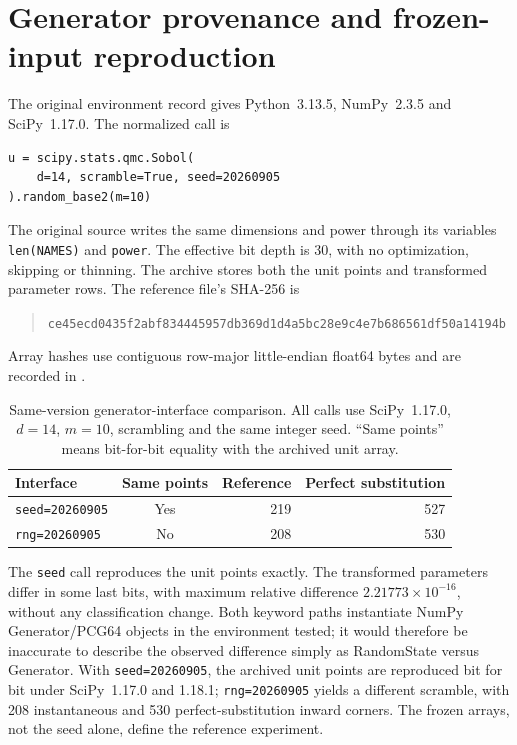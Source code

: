 \documentclass[11pt,a4paper]{article}
\begin{document}
\section{Generator provenance and frozen-input reproduction}
The original environment record gives Python~3.13.5, NumPy~2.3.5 and
SciPy~1.17.0. The normalized call is
\begin{verbatim}
u = scipy.stats.qmc.Sobol(
    d=14, scramble=True, seed=20260905
).random_base2(m=10)
\end{verbatim}
The original source writes the same dimensions and power through its
variables \texttt{len(NAMES)} and \texttt{power}. The effective bit depth
is 30, with no optimization, skipping or thinning. The archive stores
both the unit points and transformed parameter rows. The reference
file's SHA-256 is
\begin{quote}\small\ttfamily
\nolinkurl{ce45ecd0435f2abf834445957db369d1d4a5bc28e9c4e7b686561df50a14194b}
\end{quote}
Array hashes use contiguous row-major little-endian float64 bytes and
are recorded in .

\begin{table}[htbp]\centering
\caption{Same-version generator-interface comparison. All calls use
SciPy~1.17.0, $d=14$, $m=10$, scrambling and the same integer seed.
``Same points'' means bit-for-bit equality with the archived unit array.}
\begin{tabular}{@{}lcrr@{}}\toprule
Interface & Same points & Reference & Perfect substitution\\\midrule
\texttt{seed=20260905} & Yes & 219 & 527 \\
\texttt{rng=20260905} & No & 208 & 530 \\
\bottomrule\end{tabular}
\end{table}
The \texttt{seed} call reproduces the unit points exactly. The transformed
parameters differ in some last bits, with maximum relative difference
$2.21773\times10^{-16}$, without any classification change. Both keyword paths
instantiate NumPy Generator/PCG64 objects in the environment tested; it
would therefore be inaccurate to describe the observed difference simply
as RandomState versus Generator. With \texttt{seed=20260905}, the archived unit points are reproduced
bit for bit under SciPy~1.17.0 and 1.18.1;
\texttt{rng=20260905} yields a different scramble, with 208
instantaneous and 530 perfect-substitution inward corners. The frozen
arrays, not the seed alone, define the reference experiment.
\end{document}
